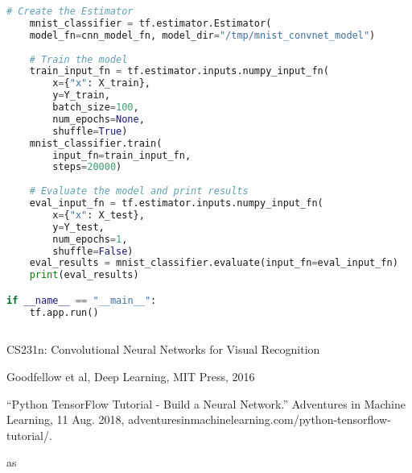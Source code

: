 \documentclass[letterpaper]{article}
\begin{document}
\begin{appendices}
\begin{lstlisting}[language=python]
	# Create the Estimator
	mnist_classifier = tf.estimator.Estimator(
	model_fn=cnn_model_fn, model_dir="/tmp/mnist_convnet_model")
	
	# Train the model
	train_input_fn = tf.estimator.inputs.numpy_input_fn(
		x={"x": X_train},
		y=Y_train,
		batch_size=100,
		num_epochs=None,
		shuffle=True)
	mnist_classifier.train(
		input_fn=train_input_fn,
		steps=20000)
	
	# Evaluate the model and print results
	eval_input_fn = tf.estimator.inputs.numpy_input_fn(
		x={"x": X_test},
		y=Y_test,
		num_epochs=1,
		shuffle=False)
	eval_results = mnist_classifier.evaluate(input_fn=eval_input_fn)
	print(eval_results)

if __name__ == "__main__":
	tf.app.run()	
	
\end{lstlisting}

\end{appendices}

\newpage
\begin{thebibliography}{9}
CS231n: Convolutional Neural Networks for Visual Recognition

Goodfellow et al, Deep Learning, MIT Press, 2016

“Python TensorFlow Tutorial - Build a Neural Network.” Adventures in Machine Learning, 11 Aug. 2018, adventuresinmachinelearning.com/python-tensorflow-tutorial/.

\end{thebibliography}

\newpage
\begin{appendices}
	
	as
	
\end{appendices}
\end{document}
